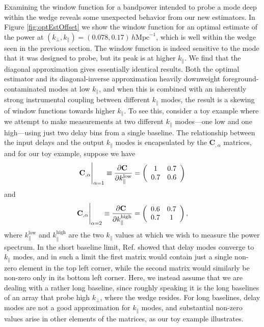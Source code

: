 \documentclass[twocolumn,aps,prd,nofootinbib,showpacs]{revtex4-1}
\begin{document}
Examining the window function for a bandpower intended to probe a mode deep within the wedge reveals some unexpected behavior from our new estimators.  In Figure \ref{fig:optEstOffset} we show the window function for an optimal estimate of the power at $(k_\perp, k_\parallel) = (0.078, 0.17)\,h\textrm{Mpc}^{-1}$, which is well within the wedge seen in the previous section.  The window function is indeed sensitive to the mode that it was designed to probe, but its peak is at higher $k_\parallel$.  We find that the diagonal approximation gives essentially identical results.  Both the optimal estimator and its diagonal-inverse approximation heavily downweight foreground-contaminated modes at low $k_\parallel$, and when this is combined with an inherently strong instrumental coupling between different $k_\parallel$ modes, the result is a skewing of window functions towards higher $k_\parallel$.  To see this, consider a toy example where we attempt to make measurements at two different $k_\parallel$ modes---one low and one high---using just two delay bins from a single baseline.  The relationship between the input delays and the output $k_\parallel$ modes is encapsulated by the $\mathbf{C}_{,\alpha}$ matrices, and for our toy example, suppose we have
\begin{equation}
\mathbf{C}_{,\alpha} \Bigg{|}_{\alpha = 1} \equiv \frac{\partial \mathbf{C}\,\,}{\partial k^{\textrm{low}}_{\parallel}} = \left( \begin{array}{cc}
1 & 0.7 \\
0.7 & 0.6
\end{array}
\right)
\end{equation}
and
\begin{equation}
\mathbf{C}_{,\alpha} \Bigg{|}_{\alpha = 2} \equiv \frac{\partial \mathbf{C}\,\,}{\partial k^{\textrm{high}}_{\parallel}}  = \left( \begin{array}{cc}
0.6 & 0.7 \\
0.7 & 1
\end{array}
\right),
\end{equation}
where $k_\parallel^{\textrm{low}}$ and $k_\parallel^{\textrm{high}}$ are the two $k_\parallel$ values at which we wish to measure the power spectrum.  In the short baseline limit, Ref. \cite{Parsons2012b} showed that delay modes converge to $k_\parallel$ modes, and in such a limit the first matrix would contain just a single non-zero element in the top left corner, while the second matrix would similarly be non-zero only in its bottom left corner.  Here, we instead assume that we are dealing with a rather long baseline, since roughly speaking it is the long baselines of an array that probe high $k_\perp$, where the wedge resides.  For long baselines, delay modes are not a good approximation for $k_\parallel$ modes, and substantial non-zero values arise in other elements of the matrices, as our toy example illustrates.
\end{document}
